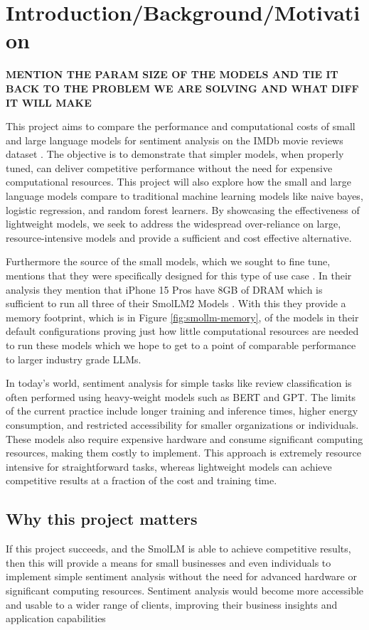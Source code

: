 \documentclass[10pt,twocolumn,letterpaper]{article}
\begin{document}
\section{Introduction/Background/Motivation}
\textbf{MENTION THE PARAM SIZE OF THE MODELS AND TIE IT BACK TO THE PROBLEM WE ARE SOLVING AND WHAT DIFF IT WILL MAKE}

This project aims to compare the performance and computational costs of small and large language models for sentiment analysis on the IMDb movie reviews dataset \cite{IMDB-dataset}. The objective is to demonstrate that simpler models, when properly tuned, can deliver competitive performance without the need for expensive computational resources. This project will also explore how the small and large language models compare to traditional machine learning models like naive bayes, logistic regression, and random forest learners. By showcasing the effectiveness of lightweight models, we seek to address the widespread over-reliance on large, resource-intensive models and provide a sufficient and cost effective alternative. 

Furthermore the source of the small models, which we sought to fine tune, mentions that they were specifically designed for this type of use case \cite{hf-smollm-usecase}. In their analysis they mention that iPhone 15 Pros have 8GB of DRAM which is sufficient to run all three of their SmolLM2 Models \cite{hf-smollm2-collection}. With this they provide a memory footprint, which is in Figure \ref{fig:smollm-memory}, of the models in their default configurations proving just how little computational resources are needed to run these models which we hope to get to a point of comparable performance to larger industry grade LLMs.

In today's world, sentiment analysis for simple tasks like review
classification is often performed using heavy-weight models such as BERT and GPT. The limits of the current practice include longer training and inference times, higher energy consumption, and restricted accessibility for smaller organizations or individuals. These models also require expensive hardware and consume significant computing resources, making them costly to implement. This approach is extremely resource intensive for straightforward tasks,
whereas lightweight models can achieve competitive results at a fraction of the cost and training time.


\subsection{Why this project matters}
If this project succeeds, and the SmolLM is able to achieve competitive results, then this will provide a means for small businesses and even individuals to implement simple sentiment analysis without the need for advanced hardware or significant computing resources. Sentiment analysis would become more accessible and usable to a wider range of clients, improving their business insights and application capabilities
\end{document}
